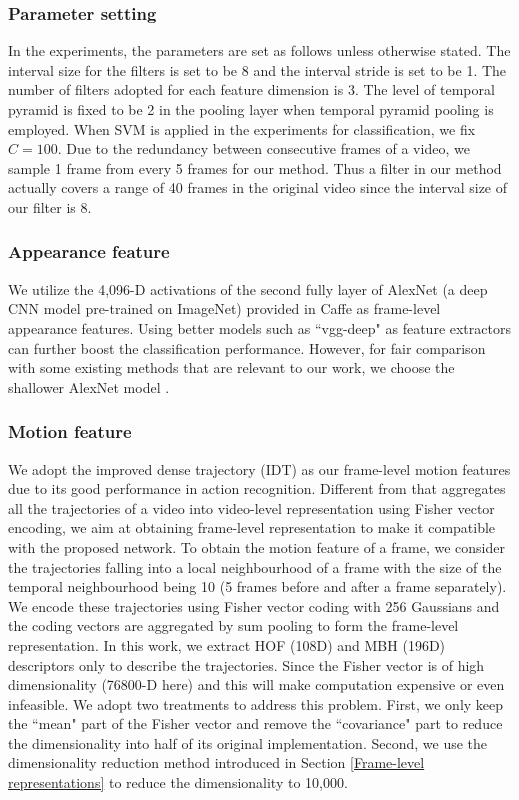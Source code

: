 \documentclass[journal]{IEEEtran}
\begin{document}
\subsubsection{Parameter setting}
In the experiments, the parameters are set as follows unless otherwise stated. The interval size for the filters is set to be 8 and the interval stride is set to be 1. The number of filters adopted for each feature dimension is 3. The level of temporal pyramid is fixed to be 2 in the pooling layer when temporal pyramid pooling is employed. When SVM is applied in the experiments for classification, we fix $C=100$. Due to the redundancy between consecutive frames of a video, we sample 1 frame from every 5 frames for our method. Thus a filter in our method actually covers a range of 40 frames in the original video since the interval size of our filter is 8.


\subsubsection{Appearance feature} We utilize the 4,096-D activations of the second fully layer of AlexNet \cite{NIPS2012_4824} (a deep CNN model pre-trained on ImageNet) provided in Caffe \cite{jia2014caffe} as frame-level appearance features. Using better models such as ``vgg-deep" \cite{Simonyan15} as feature extractors can further boost the classification performance. However, for fair comparison with some existing methods \cite{Andrew14, KarpathyCVPR14} that are relevant to our work, we choose the shallower AlexNet model \cite{NIPS2012_4824}.

\subsubsection{Motion feature} We adopt the improved dense trajectory (IDT) \cite{Wang2013} as our frame-level motion features due to its good performance in action recognition. Different from \cite{Wang2013} that aggregates all the trajectories of a video into video-level representation using Fisher vector encoding, we aim at obtaining frame-level representation to make it compatible with the proposed network. To obtain the motion feature of a frame,
%
we consider the trajectories falling into a local neighbourhood of a frame with the size of the temporal neighbourhood being 10 (5 frames before and after a frame separately).
We encode these trajectories using Fisher vector coding with 256 Gaussians and the coding vectors are aggregated by sum pooling to form the frame-level representation. In this work, we extract HOF (108D) and MBH (196D) descriptors only to describe the trajectories. Since the Fisher vector is of high dimensionality (76800-D here) and this will make computation expensive or even infeasible. We adopt two treatments to address this problem. First, we only keep the ``mean" part of the Fisher vector and remove the ``covariance" part to reduce the dimensionality into half of its original implementation. Second, we use the dimensionality reduction method introduced in Section \ref{Frame-level representations} to reduce the dimensionality to 10,000.
\end{document}
